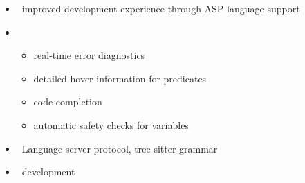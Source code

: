 \begin{frame}{\clinsight}
  \begin{itemize}
  \item {} \ improved development experience through ASP language support
  \item {}
    \begin{itemize}
      \item real-time error diagnostics
      \item detailed hover information for predicates
      \item code completion
      \item automatic safety checks for variables
    \end{itemize}
  \item {} \ Language server protocol, tree-sitter grammar
  \item {} \ development
  \end{itemize}
\end{frame}
%
